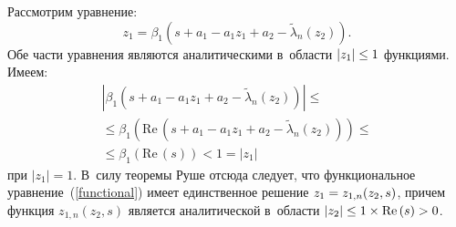\begin{multicols}{2}
Рассмотрим уравнение:
\begin{equation}
z_1=\beta_1\left(s+a_1-a_1 z_1+a_2-\widetilde{\lambda}_n(z_2)\right).
\label{functional}
\end{equation}
Обе части уравнения являются аналитическими в~области $|z_1|\hm\leq 1$ функциями. 
Имеем:
\begin{multline*}
\left\vert \beta_1\left(s+a_1-a_1 z_1+a_2-\widetilde{\lambda}_n
\left(z_2\right)\right)\right\vert
\leq{}\\
{}\leq \beta_1\left( 
\mathrm{Re}\,\left(s+a_1-a_1 z_1+a_2-\widetilde{\lambda}_n\left(z_2\right)\right)
\right)\leq{}\\
{}\leq 
\beta_1(\mathrm{Re}\,(s))<1=\left\vert z_1\right\vert
\end{multline*}
при $|z_1|=1$. В~силу теоремы Руше отсюда следует, что функциональное 
уравнение~(\ref{functional}) имеет единственное решение $z_1\hm=z_{1,n}(z_2,s)$, 
причем функция $z_{1,n}(z_2,s)$ является аналитической в~области $|z_2|\hm\leq 
1\times\mathrm{Re}\,(s)\hm>0$.


\end{multicols}
